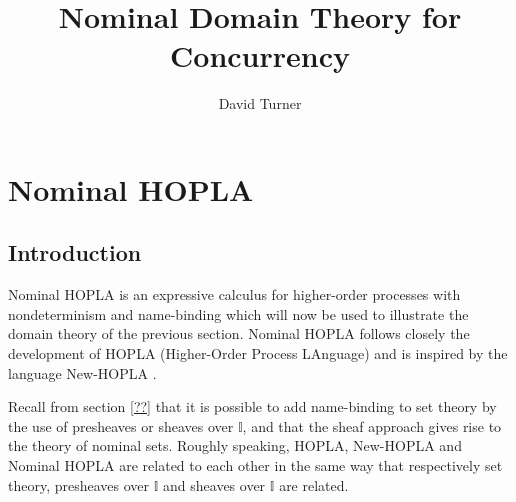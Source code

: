 \documentclass[twoside]{article}
\title{Nominal Domain Theory for Concurrency}
\date{\revisionnumber}
\author{David Turner}
\begin{document}

%

\section{Nominal HOPLA}

\subsection{Introduction}

Nominal HOPLA is an expressive calculus for higher-order processes with
nondeterminism and name-binding which will now be used to illustrate the
domain theory of the previous section. Nominal HOPLA follows closely the
development of HOPLA (Higher-Order Process LAnguage) \cite{nygaardwinskel1}
and is inspired by the language New-HOPLA \cite{zappanardelliwinskel}.

Recall from section \ref{??} that it is possible to add name-binding to set
theory by the use of presheaves or sheaves over $\mathbb{I}$, and that the
sheaf approach gives rise to the theory of nominal sets. Roughly speaking,
HOPLA, New-HOPLA and Nominal HOPLA are related to each other in the same way
that respectively set theory, presheaves over $\mathbb{I}$ and sheaves over $\mathbb{I}$
are related.




%


%







\vfill\pagebreak






%
%





\end{document}
